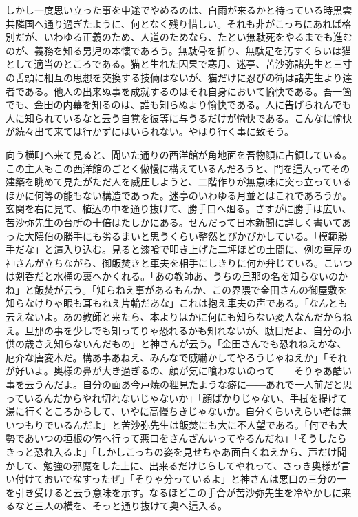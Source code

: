\documentclass[12pt, openright]{book}
\begin{document}
しかし一度思い立った事を中途でやめるのは、白雨が来るかと待っている時黒雲共隣国へ通り過ぎたように、何となく残り惜しい。それも非がこっちにあれば格別だが、いわゆる正義のため、人道のためなら、たとい無駄死をやるまでも進むのが、義務を知る男児の本懐であろう。無駄骨を折り、無駄足を汚すくらいは猫として適当のところである。猫と生れた因果で寒月、迷亭、苦沙弥諸先生と三寸の舌頭に相互の思想を交換する技倆はないが、猫だけに忍びの術は諸先生より達者である。他人の出来ぬ事を成就するのはそれ自身において愉快である。吾一箇でも、金田の内幕を知るのは、誰も知らぬより愉快である。人に告げられんでも人に知られているなと云う自覚を彼等に与うるだけが愉快である。こんなに愉快が続々出て来ては行かずにはいられない。やはり行く事に致そう。

向う横町へ来て見ると、聞いた通りの西洋館が角地面を吾物顔に占領している。この主人もこの西洋館のごとく傲慢に構えているんだろうと、門を這入ってその建築を眺めて見たがただ人を威圧しようと、二階作りが無意味に突っ立っているほかに何等の能もない構造であった。迷亭のいわゆる月並とはこれであろうか。玄関を右に見て、植込の中を通り抜けて、勝手口へ廻る。さすがに勝手は広い、苦沙弥先生の台所の十倍はたしかにある。せんだって日本新聞に詳しく書いてあった大隈伯の勝手にも劣るまいと思うくらい整然とぴかぴかしている。「模範勝手だな」と這入り込む。見ると漆喰で叩き上げた二坪ほどの土間に、例の車屋の神さんが立ちながら、御飯焚きと車夫を相手にしきりに何か弁じている。こいつは剣呑だと水桶の裏へかくれる。「あの教師あ、うちの旦那の名を知らないのかね」と飯焚が云う。「知らねえ事があるもんか、この界隈で金田さんの御屋敷を知らなけりゃ眼も耳もねえ片輪だあな」これは抱え車夫の声である。「なんとも云えないよ。あの教師と来たら、本よりほかに何にも知らない変人なんだからねえ。旦那の事を少しでも知ってりゃ恐れるかも知れないが、駄目だよ、自分の小供の歳さえ知らないんだもの」と神さんが云う。「金田さんでも恐れねえかな、厄介な唐変木だ。構あ事あねえ、みんなで威嚇かしてやろうじゃねえか」「それが好いよ。奥様の鼻が大き過ぎるの、顔が気に喰わないのって――そりゃあ酷い事を云うんだよ。自分の面あ今戸焼の狸見たような癖に――あれで一人前だと思っているんだからやれ切れないじゃないか」「顔ばかりじゃない、手拭を提げて湯に行くところからして、いやに高慢ちきじゃないか。自分くらいえらい者は無いつもりでいるんだよ」と苦沙弥先生は飯焚にも大に不人望である。「何でも大勢であいつの垣根の傍へ行って悪口をさんざんいってやるんだね」「そうしたらきっと恐れ入るよ」「しかしこっちの姿を見せちゃあ面白くねえから、声だけ聞かして、勉強の邪魔をした上に、出来るだけじらしてやれって、さっき奥様が言い付けておいでなすったぜ」「そりゃ分っているよ」と神さんは悪口の三分の一を引き受けると云う意味を示す。なるほどこの手合が苦沙弥先生を冷やかしに来るなと三人の横を、そっと通り抜けて奥へ這入る。
\end{document}
